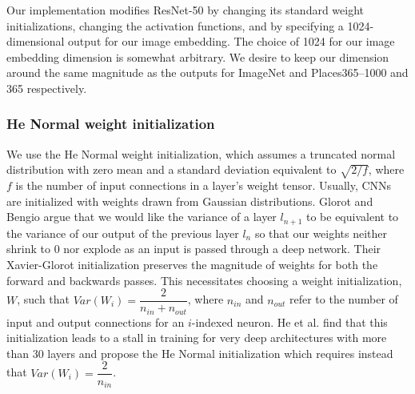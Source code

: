Our implementation modifies ResNet-50 by changing its standard weight initializations, changing the activation functions, and by specifying a 1024-dimensional output for our image embedding. The choice of 1024 for our image embedding dimension is somewhat arbitrary. We desire to keep our dimension around the same magnitude as the outputs for ImageNet and Places365--1000 and 365 respectively.

\subsubsection{}

\subsubsection{He Normal weight initialization}
We use the He Normal weight initialization, which assumes a truncated normal distribution with zero mean and a standard deviation equivalent to $\sqrt{2 / f}$, where $f$ is the number of input connections in a layer's weight tensor. Usually, CNNs are initialized with weights drawn from Gaussian distributions. Glorot and Bengio argue that we would like the variance of a layer $l_{n+1}$ to be equivalent to the variance of our output of the previous layer $l_{n}$ so that our weights neither shrink to 0 nor explode as an input is passed through a deep network.\cite{glorot2010understanding} Their Xavier-Glorot initialization preserves the magnitude of weights for both the forward and backwards passes. This necessitates choosing a weight initialization, $W$, such that $Var(W_i) = \dfrac{2}{n_{in}+n_{out}}$, where $n_{in}$ and $n_{out}$ refer to the number of input and output connections for an $i$-indexed neuron. He et al. find that this initialization leads to a stall in training for very deep architectures with more than 30 layers and propose the He Normal initialization which requires instead that $Var(W_i) = \dfrac{2}{n_{in}}$.\cite{he2015delving}

